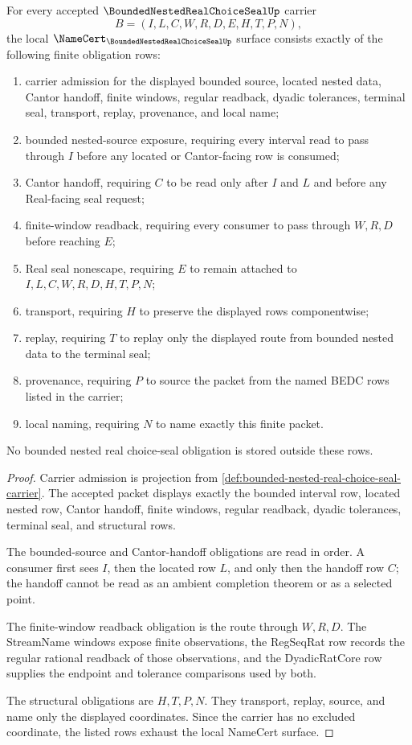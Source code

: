 \begin{theorem}
\label{thm:bounded-nested-real-choice-seal-namecert-obligations}
For every accepted $\BoundedNestedRealChoiceSealUp$ carrier
$$
B=(I,L,C,W,R,D,E,H,T,P,N),
$$
the local $\NameCert_{\BoundedNestedRealChoiceSealUp}$ surface consists exactly of the following finite obligation rows:
\begin{enumerate}
\item carrier admission for the displayed bounded source, located nested data, Cantor handoff, finite windows, regular readback, dyadic tolerances, terminal seal, transport, replay, provenance, and local name;
\item bounded nested-source exposure, requiring every interval read to pass through $I$ before any located or Cantor-facing row is consumed;
\item Cantor handoff, requiring $C$ to be read only after $I$ and $L$ and before any Real-facing seal request;
\item finite-window readback, requiring every consumer to pass through $W,R,D$ before reaching $E$;
\item Real seal nonescape, requiring $E$ to remain attached to $I,L,C,W,R,D,H,T,P,N$;
\item transport, requiring $H$ to preserve the displayed rows componentwise;
\item replay, requiring $T$ to replay only the displayed route from bounded nested data to the terminal seal;
\item provenance, requiring $P$ to source the packet from the named BEDC rows listed in the carrier;
\item local naming, requiring $N$ to name exactly this finite packet.
\end{enumerate}
No bounded nested real choice-seal obligation is stored outside these rows.
\end{theorem}
\begin{proof}
Carrier admission is projection from \autoref{def:bounded-nested-real-choice-seal-carrier}. The accepted packet displays exactly the bounded interval row, located nested row, Cantor handoff, finite windows, regular readback, dyadic tolerances, terminal seal, and structural rows.

The bounded-source and Cantor-handoff obligations are read in order. A consumer first sees $I$, then the located row $L$, and only then the handoff row $C$; the handoff cannot be read as an ambient completion theorem or as a selected point.

The finite-window readback obligation is the route through $W,R,D$. The StreamName windows expose finite observations, the RegSeqRat row records the regular rational readback of those observations, and the DyadicRatCore row supplies the endpoint and tolerance comparisons used by both.

The structural obligations are $H,T,P,N$. They transport, replay, source, and name only the displayed coordinates. Since the carrier has no excluded coordinate, the listed rows exhaust the local NameCert surface.
\end{proof}

